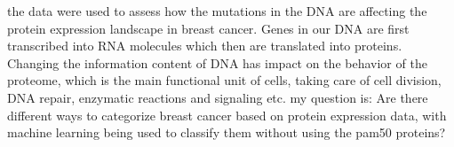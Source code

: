 the data were used to assess how the mutations in the DNA are affecting the protein expression landscape in breast cancer.
Genes in our DNA are first transcribed into RNA molecules which then are translated into proteins.
Changing the information content of DNA has impact on the behavior of the proteome, which is the main functional unit of cells, taking care of cell division, DNA repair, enzymatic reactions and signaling etc.
my question is: Are there different ways to categorize breast cancer based on protein expression data, with machine learning being used to classify them without using the pam50 proteins?
